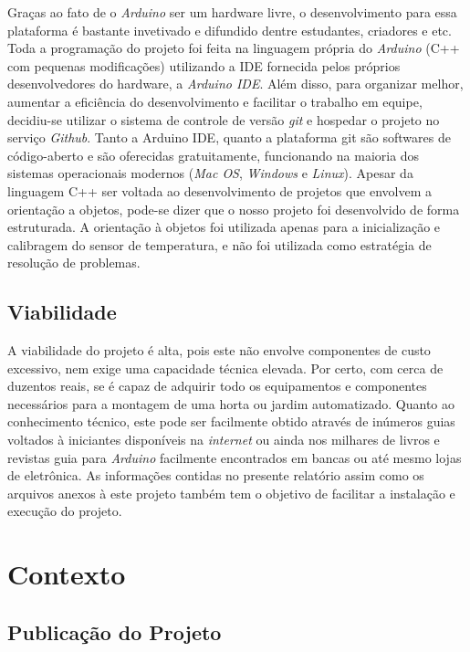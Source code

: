 \documentclass[a4paper,12pt]{article}
\begin{document}
Graças ao fato de o \textit{Arduino} ser um hardware livre, o desenvolvimento para essa plataforma é bastante invetivado e difundido dentre estudantes, criadores e etc. Toda a programação do projeto foi feita na linguagem própria do \textit{Arduino} (C++ com pequenas modificações) utilizando a IDE fornecida pelos próprios desenvolvedores do hardware, a \textit{Arduino IDE}. Além disso, para organizar melhor, aumentar a eficiência do desenvolvimento e facilitar o trabalho em equipe, decidiu-se utilizar o sistema de controle de versão \textit{git} e hospedar o projeto no serviço \textit{Github}. Tanto a Arduino IDE, quanto a plataforma git são softwares de código-aberto e são oferecidas gratuitamente, funcionando na maioria dos sistemas operacionais modernos (\textit{Mac OS}, \textit{Windows} e \textit{Linux}).
    Apesar da linguagem C++ ser voltada ao desenvolvimento de projetos que envolvem a orientação a objetos, pode-se dizer que o nosso projeto foi desenvolvido de forma estruturada. A orientação à objetos foi utilizada apenas para a inicialização e calibragem do sensor de temperatura, e não foi utilizada como estratégia de resolução de problemas.



\subsection{Viabilidade}

A viabilidade do projeto é alta, pois este não envolve componentes de custo excessivo, nem exige uma capacidade técnica elevada. Por certo, com cerca de duzentos reais, se é capaz de adquirir todo os equipamentos e componentes necessários para a montagem de uma horta ou jardim automatizado. Quanto ao conhecimento técnico, este pode ser facilmente obtido através de inúmeros guias voltados à iniciantes disponíveis na \textit{internet} ou ainda nos milhares de livros e revistas guia para \textit{Arduino} facilmente encontrados em bancas ou até mesmo lojas de eletrônica. As informações contidas no presente relatório assim como os arquivos anexos à este projeto também tem o objetivo de facilitar a instalação e execução do projeto.



\section{Contexto}
\subsection{Publicação do Projeto}
\end{document}
